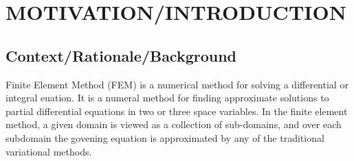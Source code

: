 




\chapter{MOTIVATION/INTRODUCTION}

\section{{\bf{Context/Rationale/Background}}}
Finite Element Method (FEM) is a numerical method for solving a differential or integral euation. It is a numeral method for finding approximate solutions to partial differential equations in two or three space variables. In the finite element method, a given domain is viewed as a collection of sub-domains, and over each subdomain the govening equation is approximated by any of the traditional variational methods.


